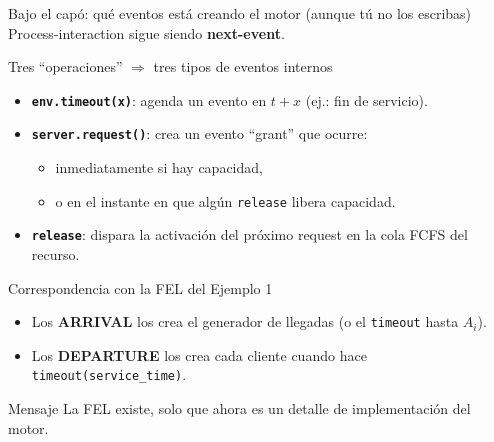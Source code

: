 \documentclass[aspectratio=1610, 9pt]{beamer}
\begin{document}
\begin{frame}{Bajo el capó: qué eventos está creando el motor (aunque tú no los escribas)}
\small
Process-interaction sigue siendo \textbf{next-event}.

\vspace{4pt}
\begin{block}{Tres “operaciones” $\Rightarrow$ tres tipos de eventos internos}
\begin{itemize}
\item \textbf{\texttt{env.timeout(x)}}: agenda un evento en $t+x$ (ej.: fin de servicio).
\item \textbf{\texttt{server.request()}}: crea un evento “grant” que ocurre:
  \begin{itemize}
  \item inmediatamente si hay capacidad,
  \item o en el instante en que algún \texttt{release} libera capacidad.
  \end{itemize}
\item \textbf{\texttt{release}}: dispara la activación del próximo request en la cola FCFS del recurso.
\end{itemize}
\end{block}

\vspace{4pt}
\begin{block}{Correspondencia con la FEL del Ejemplo 1}
\begin{itemize}
\item Los \textbf{ARRIVAL} los crea el generador de llegadas (o el \texttt{timeout} hasta $A_i$).
\item Los \textbf{DEPARTURE} los crea cada cliente cuando hace \texttt{timeout(service\_time)}.
\end{itemize}
\end{block}

\vspace{2pt}
\begin{alertblock}{Mensaje}
La FEL existe, solo que ahora es un detalle de implementación del motor.
\end{alertblock}
\end{frame}
\end{document}
